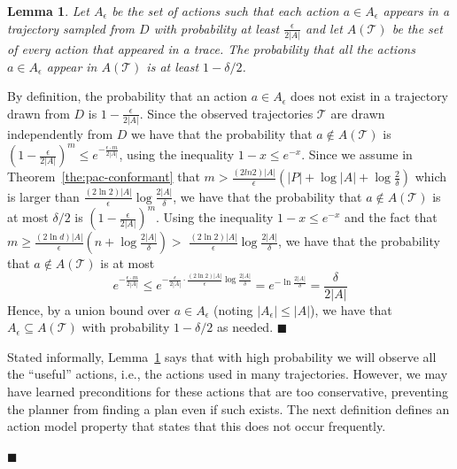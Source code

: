\documentclass{article}
\newtheorem{lemma}{Lemma}
\newenvironment{proof}{\noindent{\bf Proof:~~}}{\qed}
\newcommand{\qed}{\hfill\ensuremath{\blacksquare}}
\begin{document}
\begin{proof}
		\begin{lemma}
			Let $A_\epsilon$ be the set of actions such that each action $a\in A_\epsilon$ appears in a trajectory sampled from $D$ with probability at least $\frac{\epsilon}{2|A|}$ and let $A(\mathcal{T})$ be the set of every action that appeared in a trace. 
			The probability that all the actions $a\in A_\epsilon$ 
			appear in $A(\mathcal{T})$ is at least $1-\delta/2$.
			\label{lem:sufficientActions}
		\end{lemma}
		\begin{proof}
			By definition, the probability that an action $a\in A_\epsilon$ does not exist in a trajectory drawn from $D$ is $1-\frac{\epsilon}{2|A|}$. 
			Since the observed trajectories $\mathcal{T}$ are drawn independently from $D$ we have that the probability that $a\notin A(\mathcal{T})$ is
			$(1-\frac{\epsilon}{2|A|})^m\leq e^{-\frac{\epsilon\cdot m}{2|A|}}$, 
			using the inequality $1-x\leq e^{-x}$. 
			Since we assume in Theorem~\ref{the:pac-conformant} that $m>\frac{(2ln 2)|A|}{\epsilon}(|P|+\log |A|+\log\frac{2}{\delta})$
			which is larger than $\frac{(2\ln 2)|A|}{\epsilon}\log\frac{2|A|}{\delta}$, 
			we have that the probability that $a\notin A(\mathcal{T})$ is at most $\delta/2$ is $(1-\frac{\epsilon}{2|A|})^m$. 
			Using the inequality $1-x\leq e^{-x}$ and 
			the fact that 
			$m\geq\frac{(2\ln  d)|A|}{\epsilon}(n+\log\frac{2|A|}{\delta})$$>$
			$\frac{(2\ln 2)|A|}{\epsilon}\log\frac{2|A|}{\delta}$, we have that the probability that $a\notin A(\mathcal{T})$ is at most
			\begin{equation}
			e^{-\frac{\epsilon\cdot m}{2|A|}}
			\leq e^{-\frac{\epsilon}{2|A|} \cdot \frac{(2\ln 2)|A|}{\epsilon}\log\frac{2|A|}{\delta}}
			=e^{-\ln\frac{2|A|}{\delta}}=\frac{\delta}{2|A|}
			\end{equation}
			Hence, by a union bound over $a\in A_\epsilon$ (noting $|A_\epsilon|\leq |A|$), we have that $A_\epsilon\subseteq A(\mathcal{T})$ with probability $1-\delta/2$ as needed.
		\end{proof}
		
		Stated informally, Lemma~\ref{lem:sufficientActions} says that with high probability we will observe
		all the ``useful'' actions, i.e., the actions used in many trajectories. However, we may have learned 
		preconditions for these actions that are too conservative, 
		preventing the planner from finding a plan even if such exists. 
		The next definition defines an action model property that states that this does not occur frequently. 
		

\end{proof}
\end{document}
